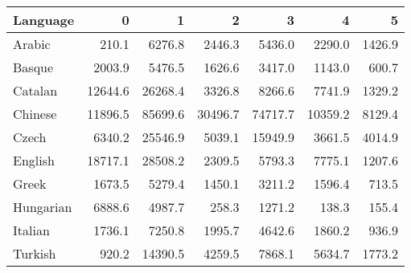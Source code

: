 \begin{tabular}{lrrrrrr}
\toprule
 Language   &       0 &       1 &       2 &       3 &       4 &      5 \\
\midrule
 Arabic     &   210.1 &  6276.8 &  2446.3 &  5436.0 &  2290.0 & 1426.9 \\
 Basque     &  2003.9 &  5476.5 &  1626.6 &  3417.0 &  1143.0 &  600.7 \\
 Catalan    & 12644.6 & 26268.4 &  3326.8 &  8266.6 &  7741.9 & 1329.2 \\
 Chinese    & 11896.5 & 85699.6 & 30496.7 & 74717.7 & 10359.2 & 8129.4 \\
 Czech      &  6340.2 & 25546.9 &  5039.1 & 15949.9 &  3661.5 & 4014.9 \\
 English    & 18717.1 & 28508.2 &  2309.5 &  5793.3 &  7775.1 & 1207.6 \\
 Greek      &  1673.5 &  5279.4 &  1450.1 &  3211.2 &  1596.4 &  713.5 \\
 Hungarian  &  6888.6 &  4987.7 &   258.3 &  1271.2 &   138.3 &  155.4 \\
 Italian    &  1736.1 &  7250.8 &  1995.7 &  4642.6 &  1860.2 &  936.9 \\
 Turkish    &   920.2 & 14390.5 &  4259.5 &  7868.1 &  5634.7 & 1773.2 \\
\bottomrule
\end{tabular}